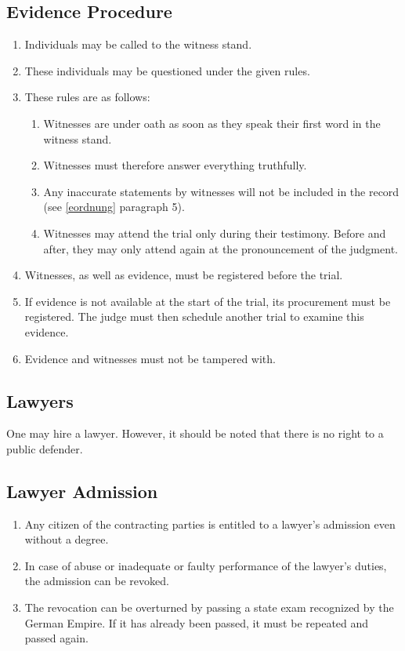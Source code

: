 \documentclass{article}
\begin{document}
\subsection{Evidence Procedure}\label{zeugen}
\begin{enumerate}[(1)]
    \item Individuals may be called to the witness stand.
    \item These individuals may be questioned under the given rules.
    \item These rules are as follows:
        \begin{enumerate}[1.]
            \item Witnesses are under oath as soon as they speak their first word in the witness stand.
            \item Witnesses must therefore answer everything truthfully.
            \item Any inaccurate statements by witnesses will not be included in the record (see \ref{eordnung} paragraph 5).
            \item Witnesses may attend the trial only during their testimony. Before and after, they may only attend again at the pronouncement of the judgment.
        \end{enumerate}
    \item Witnesses, as well as evidence, must be registered before the trial.
    \item If evidence is not available at the start of the trial, its procurement must be registered. The judge must then schedule another trial to examine this evidence.
    \item Evidence and witnesses must not be tampered with.
\end{enumerate}

\subsection{Lawyers}
One may hire a lawyer. However, it should be noted that there is no right to a public defender.

\subsection{Lawyer Admission}
\begin{enumerate}[(1)]
    \item Any citizen of the contracting parties is entitled to a lawyer's admission even without a degree.
    \item In case of abuse or inadequate or faulty performance of the lawyer's duties, the admission can be revoked.
    \item The revocation can be overturned by passing a state exam recognized by the German Empire. If it has already been passed, it must be repeated and passed again.
\end{enumerate}
    
\end{document}

